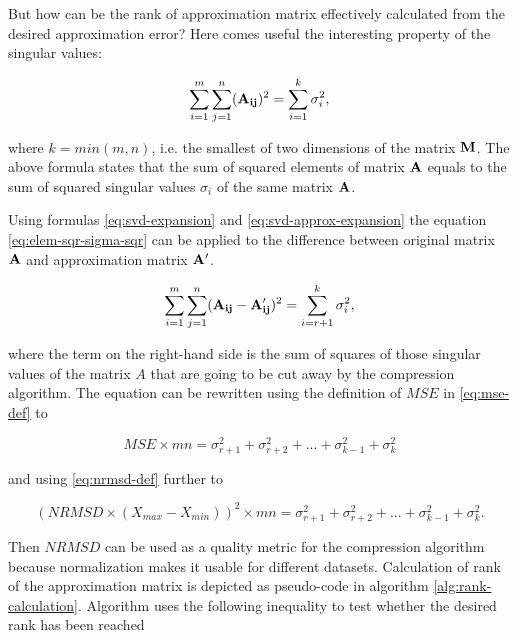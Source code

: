 But how can be the rank of approximation matrix effectively calculated from the desired approximation error? Here comes useful the interesting property of the singular values:


\begin{equation}
\sum_{i=1}^{m} \sum_{j=1}^{n} (\mathbf{A_{ij}})^{2} = \sum_{i=1}^{k}{\sigma_{i}^{2}},
\label{eq:elem-sqr-sigma-sqr}
\end{equation}

\noindent
where $k=min(m, n)$, i.e. the smallest of two dimensions of the matrix $\mathbf{M}$. The above formula states that the sum of squared elements of matrix $\mathbf{A}$ equals to the sum of squared singular values $\sigma_{i}$ of the same matrix $\mathbf{A}$.

Using formulas \eqref{eq:svd-expansion} and \eqref{eq:svd-approx-expansion} the equation \eqref{eq:elem-sqr-sigma-sqr} can be applied to the difference between original matrix $\mathbf{A}$ and approximation matrix $\mathbf{A'}$.

\begin{equation}
\sum_{i=1}^{m} \sum_{j=1}^{n} (\mathbf{A_{ij}} - \mathbf{A'_{ij}})^{2} = \sum_{i=r+1}^{k}{\sigma_{i}^{2}},
\end{equation}

\noindent
where the term on the right-hand side is the sum of squares of those singular values of the matrix $A$ that are going to be cut away by the compression algorithm. The equation can be rewritten using the definition of $MSE$ in \eqref{eq:mse-def} to

\begin{equation}
MSE \times m n = \sigma_{r+1}^{2} + \sigma_{r+2}^{2} + ... + \sigma_{k-1}^{2} + \sigma_{k}^2
\end{equation}

\noindent
and using \eqref{eq:nrmsd-def} further to

\begin{equation}
(NRMSD \times (X_{max}-X_{min}))^{2} \times m n = \sigma_{r+1}^{2} + \sigma_{r+2}^{2} + ... + \sigma_{k-1}^{2} + \sigma_{k}^2.
\end{equation}

Then $NRMSD$ can be used as a quality metric for the compression algorithm because normalization makes it usable for different datasets. Calculation of rank of the approximation matrix is depicted as pseudo-code in algorithm \ref{alg:rank-calculation}. Algorithm uses the following inequality to test whether the desired rank has been reached

